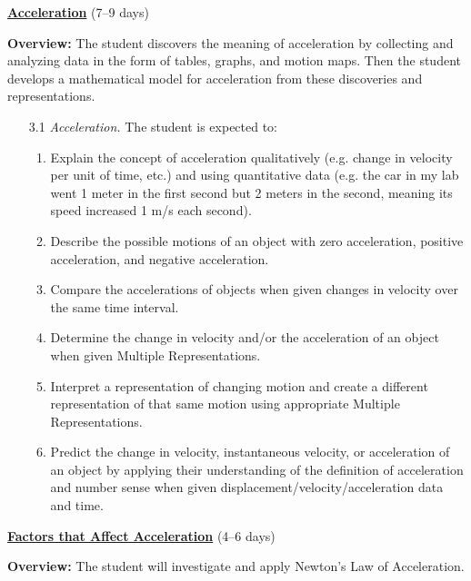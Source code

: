 \documentclass[dvipsnames]{article}
\begin{document}
\textbf{\underline{Acceleration}} (7--9 days)

\textbf{Overview:} The student discovers the meaning of acceleration by collecting and analyzing data in the form of tables, graphs, and motion maps. Then the student develops a mathematical model for acceleration from these discoveries and representations.

\begin{enumerate}[topsep=0pt]
    \item[3.1] \textit{Acceleration.} The student is expected to:
    \begin{enumerate}[topsep=0pt,itemsep=0pt]
        \item Explain the concept of acceleration qualitatively (e.g. change in velocity per unit of time, etc.) and using quantitative data (e.g. the car in my lab went 1 meter in the first second but 2 meters in the second, meaning its speed increased 1 m/s each second).
        \item Describe the possible motions of an object with zero acceleration, positive acceleration, and negative acceleration.
        \item Compare the accelerations of objects when given changes in velocity over the same time interval.
        \item Determine the change in velocity and/or the acceleration of an object when given Multiple Representations.
        \item Interpret a representation of changing motion and create a different representation of that same motion using appropriate Multiple Representations.
        \item Predict the change in velocity, instantaneous velocity, or acceleration of an object by applying their understanding of the definition of acceleration and number sense when given displacement/velocity/acceleration data and time.
    \end{enumerate}
\end{enumerate}

\textbf{\underline{Factors that Affect Acceleration}} (4--6 days)

\textbf{Overview:} The student will investigate and apply Newton's Law of Acceleration.
\end{document}
